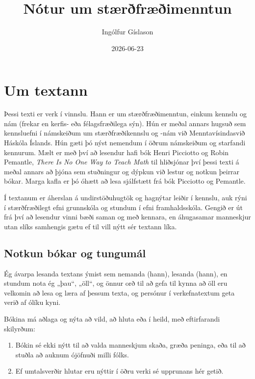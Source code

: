 \documentclass[
  icelandic,
]{book}
\title{Nótur um stærðfræðimenntun}
\author{Ingólfur Gíslason}
\date{2026-06-23}
\begin{document}
\maketitle

{
\setcounter{tocdepth}{1}
\tableofcontents
}
\chapter{Um textann}\label{umtextann}

Þessi texti er verk í vinnslu. Hann er um stærðfræðimenntun, einkum kennslu og nám (frekar en kerfis- eða félagsfræðilega sýn). Hún er meðal annars hugsuð sem kennsluefni í námskeiðum um stærðfræðikennslu og -nám við Menntavísindasvið Háskóla Íslands. Hún gæti þó nýst nemendum í öðrum námskeiðum og starfandi kennurum. Mælt er með því að lesendur hafi bók Henri Picciotto og Robin Pemantle, \emph{There Is No One Way to Teach Math} \autocite{picciotto2025} til hliðsjónar því þessi texti á meðal annars að þjóna sem stuðningur og dýpkun við lestur og notkun þeirrar bókar. Marga kafla er þó óhætt að lesa sjálfstætt frá bók Picciotto og Pemantle.

Í textanum er áherslan á undirstöðuhugtök og hagnýtar leiðir í kennslu, auk rýni í stærðfræðilegt efni grunnskóla og stundum í efni framhaldsskóla. Gengið er út frá því að lesendur vinni bæði saman og með kennara, en áhugasamar manneskjur utan slíks samhengis gætu ef til vill nýtt sér textann líka.

\section{Notkun bókar og tungumál}\label{notkun-tungumal}

Ég ávarpa lesanda textans ýmist sem nemanda (hann), lesanda (hann), en stundum nota ég „þau``, „öll``, og önnur orð til að gefa til kynna að öll eru velkomin að lesa og læra af þessum texta, og persónur í verkefnatextum geta verið af ólíku kyni.

Bókina má aðlaga og nýta að vild, að hluta eða í heild, með eftirfarandi skilyrðum:

\begin{enumerate}
\def\labelenumi{\arabic{enumi}.}
\item
  Bókin sé ekki nýtt til að valda manneskjum skaða, græða peninga, eða til að stuðla að auknum ójöfnuði milli fólks.
\item
  Ef umtalsverðir hlutar eru nýttir í öðru verki sé upprunans hér getið.
\end{enumerate}
\end{document}
